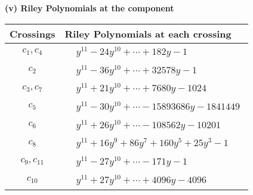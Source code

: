 \documentclass[1p]{elsarticle_modified}
\theoremstyle{definition}
\begin{document}
\newpage\renewcommand{\arraystretch}{1}
\flushleft \textbf{(v) Riley Polynomials at the component}\newline \\
\begin{tabular}{m{50pt}|m{274pt}}
Crossings & \hspace{64pt}Riley Polynomials at each crossing \\
\hline $$\begin{aligned}c_{1},c_{4}\end{aligned}$$&$\begin{aligned}
&y^{11}-24 y^{10}+\cdots+182 y-1
\end{aligned}$\\
\hline $$\begin{aligned}c_{2}\end{aligned}$$&$\begin{aligned}
&y^{11}-36 y^{10}+\cdots+32578 y-1
\end{aligned}$\\
\hline $$\begin{aligned}c_{3},c_{7}\end{aligned}$$&$\begin{aligned}
&y^{11}+21 y^{10}+\cdots+7680 y-1024
\end{aligned}$\\
\hline $$\begin{aligned}c_{5}\end{aligned}$$&$\begin{aligned}
&y^{11}-30 y^{10}+\cdots-15893686 y-1841449
\end{aligned}$\\
\hline $$\begin{aligned}c_{6}\end{aligned}$$&$\begin{aligned}
&y^{11}+26 y^{10}+\cdots-108562 y-10201
\end{aligned}$\\
\hline $$\begin{aligned}c_{8}\end{aligned}$$&$\begin{aligned}
&y^{11}+16 y^9+86 y^7+160 y^5+25 y^3-1
\end{aligned}$\\
\hline $$\begin{aligned}c_{9},c_{11}\end{aligned}$$&$\begin{aligned}
&y^{11}-27 y^{10}+\cdots-171 y-1
\end{aligned}$\\
\hline $$\begin{aligned}c_{10}\end{aligned}$$&$\begin{aligned}
&y^{11}+27 y^{10}+\cdots+4096 y-4096
\end{aligned}$\\
\hline
\end{tabular}\\~\\
\end{document}
